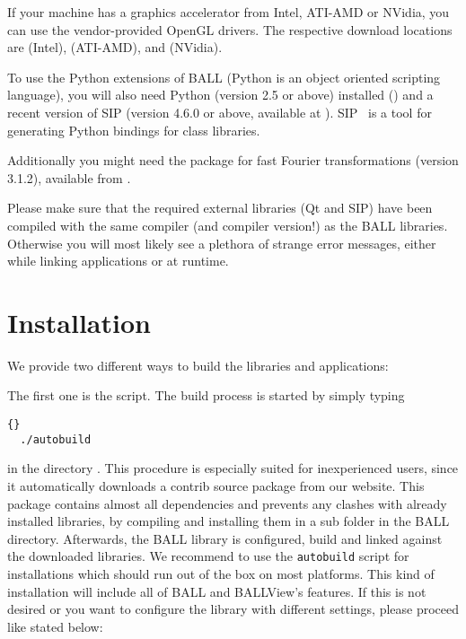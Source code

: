 If your machine has a graphics accelerator from Intel, ATI-AMD or NVidia, you
can use the vendor-provided OpenGL drivers. The respective download locations
are  (Intel),
 (ATI-AMD), and
 (NVidia).

To use the Python extensions of BALL (Python is an object oriented scripting
language),  you will also need Python (version 2.5 or above) 
installed () and a recent version of SIP (version 
4.6.0 or above, available at ).
SIP~\cite{SIP}  is a tool for generating Python bindings for \CPP 
class libraries.

Additionally you might need the  \cite{FFTW} package for fast 
Fourier transformations (version 3.1.2), available from 
.

Please make sure that the required external \CPP libraries (\ie Qt and SIP)
have been compiled with the same compiler (and compiler version!) as the BALL
libraries. Otherwise you will most likely see a plethora of strange error
messages, either while linking applications or at runtime.


\section{Installation}
\label{section:building-ball}

We provide two different ways to build the libraries and applications:

The first one is the  script. The build process is started by 
simply typing

\begin{lstlisting}{}
  ./autobuild
\end{lstlisting}

\noindent in the directory .  
This procedure is especially suited for inexperienced users, since it 
automatically downloads a contrib source package from our website. This 
package contains almost all dependencies and prevents any clashes with already 
installed libraries, by compiling and installing them in a sub folder in the 
BALL directory. Afterwards, the BALL library is configured, build and linked 
against the downloaded libraries. We recommend to use the {\tt autobuild} 
script for installations which should run out of the box on most platforms. 
This kind of installation will include all of
BALL and \mbox{BALLView's} features. If this is not desired or you want to 
configure the library with different settings, please proceed like stated below:

